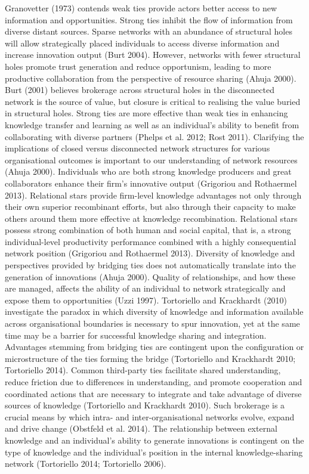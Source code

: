 Granovetter (1973) contends weak ties provide actors better access to new information and opportunities. Strong ties inhibit the flow of information from diverse distant sources. Sparse networks with an abundance of structural holes will allow strategically placed individuals to access diverse information and increase innovation output (Burt 2004). However, networks with fewer structural holes promote trust generation and reduce opportunism, leading to more productive collaboration from the perspective of resource sharing (Ahuja 2000). Burt (2001) believes brokerage across structural holes in the disconnected network is the source of value, but closure is critical to realising the value buried in structural holes. Strong ties are more effective than weak ties in enhancing knowledge transfer and learning as well as an individual’s ability to benefit from collaborating with diverse partners (Phelps et al. 2012; Rost 2011). Clarifying the implications of closed versus disconnected network structures for various organisational outcomes is important to our understanding of network resources (Ahuja 2000).
Individuals who are both strong knowledge producers and great collaborators enhance their firm’s innovative output (Grigoriou and Rothaermel 2013). Relational stars provide firm-level knowledge advantages not only through their own superior recombinant efforts, but also through their capacity to make others around them more effective at knowledge recombination. Relational stars possess strong combination of both human and social capital, that is, a strong individual-level productivity performance combined with a highly consequential network position (Grigoriou and Rothaermel 2013). 
Diversity of knowledge and perspectives provided by bridging ties does not automatically translate into the generation of innovations (Ahuja 2000). Quality of relationships, and how these are managed, affects the ability of an individual to network strategically and expose them to opportunities (Uzzi 1997). Tortoriello and Krackhardt (2010) investigate the paradox in which diversity of knowledge and information available across organisational boundaries is necessary to spur innovation, yet at the same time may be a barrier for successful knowledge sharing and integration. Advantages stemming from bridging ties are contingent upon the configuration or microstructure of the ties forming the bridge (Tortoriello and Krackhardt 2010; Tortoriello 2014). Common third-party ties facilitate shared understanding, reduce friction due to differences in understanding, and promote cooperation and coordinated actions that are necessary to integrate and take advantage of diverse sources of knowledge (Tortoriello and Krackhardt 2010). Such brokerage is a crucial means by which intra- and inter-organisational networks evolve, expand and drive change (Obstfeld et al. 2014). The relationship between external knowledge and an individual’s ability to generate innovations is contingent on the type of knowledge and the individual’s position in the internal knowledge-sharing network (Tortoriello 2014; Tortoriello 2006). 


